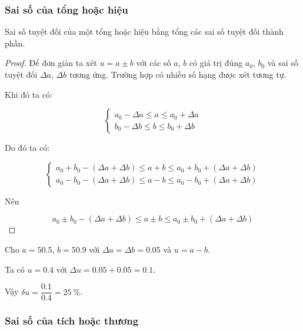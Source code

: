 \documentclass[../../Lectures.tex]{subfiles}
\begin{document}
\subsubsection{Sai số của tổng hoặc hiệu}

\begin{proposition}\label{prop:error_of_sum}
    Sai số tuyệt đối của một tổng hoặc hiệu bằng tổng các sai số tuyệt đối thành
    phần.
\end{proposition}

\begin{proof}
    Để đơn giản ta xét \(u = a \pm b\) với các số \(a\), \(b\) có giá trị đúng
    \(a_0\), \(b_0\) và sai số tuyệt đối \(\Delta a\), \(\Delta b\) tương ứng.
    Trường hợp có nhiều số hạng được xét tương tự.

    Khi đó ta có:

    \[\begin{cases}
        a_0 - \Delta a \leq a \leq a_0 + \Delta a \\
        b_0 - \Delta b \leq b \leq b_0 + \Delta b
    \end{cases}\]

    Do đó ta có:

    \[\begin{cases}
        a_0 + b_0 - (\Delta a + \Delta b) \leq a + b \leq a_0 + b_0 + (\Delta a + \Delta b) \\
        a_0 - b_0 - (\Delta a + \Delta b) \leq a - b \leq a_0 - b_0 + (\Delta a + \Delta b)
    \end{cases}\]

    Nên

    \[a_0 \pm b_0 - (\Delta a + \Delta b) \leq a \pm b \leq a_0 \pm b_0 + (\Delta a + \Delta b)\]
\end{proof}

\begin{exmp}
    Cho \(a = \num{50.5}\), \(b = \num{50.9}\) với \(\Delta a = \Delta b =
    \num{0.05}\) và \(u = a - b\).

    Ta có \(u = \num{0.4}\) với \(\Delta u = \num{0.05} + \num{0.05} =
    \num{0.1}\).

    Vậy \(\delta u = \dfrac{\num{0.1}}{\num{0.4}} = \qty{25}{\percent}\).
\end{exmp}

\subsubsection{Sai số của tích hoặc thương}
\end{document}
